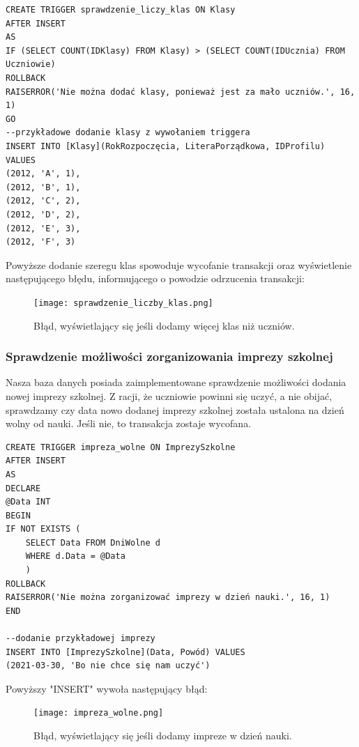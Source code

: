 \documentclass[60pt]{article}
\begin{document}
\begin{verbatim}
CREATE TRIGGER sprawdzenie_liczy_klas ON Klasy
AFTER INSERT
AS
IF (SELECT COUNT(IDKlasy) FROM Klasy) > (SELECT COUNT(IDUcznia) FROM Uczniowie)
ROLLBACK
RAISERROR('Nie można dodać klasy, ponieważ jest za mało uczniów.', 16, 1)
GO
--przykładowe dodanie klasy z wywołaniem triggera
INSERT INTO [Klasy](RokRozpoczęcia, LiteraPorządkowa, IDProfilu) VALUES
(2012, 'A', 1),
(2012, 'B', 1),
(2012, 'C', 2),
(2012, 'D', 2),
(2012, 'E', 3),
(2012, 'F', 3)
\end{verbatim}

Powyższe dodanie szeregu klas spowoduje wycofanie transakcji oraz wyświetlenie następującego błędu, informującego o powodzie odrzucenia transakcji:

\begin{figure}[h]
  \texttt{[image: sprawdzenie\_liczby\_klas.png]}
  \caption{Błąd, wyświetlający się jeśli dodamy więcej klas niż uczniów.}
  \label{Błąd, wyświetlający się jeśli dodamy więcej klas niż uczniów.}
\end{figure}

\subsubsection{Sprawdzenie możliwości zorganizowania imprezy szkolnej}

Nasza baza danych posiada zaimplementowane sprawdzenie możliwości dodania nowej imprezy szkolnej. Z racji, że uczniowie powinni się uczyć, a nie obijać, sprawdzamy czy data nowo dodanej imprezy szkolnej została ustalona na dzień wolny od nauki. Jeśli nie, to transakcja zostaje wycofana.

\begin{verbatim}
CREATE TRIGGER impreza_wolne ON ImprezySzkolne
AFTER INSERT
AS 
DECLARE
@Data INT
BEGIN
IF NOT EXISTS (
    SELECT Data FROM DniWolne d
    WHERE d.Data = @Data
    )
ROLLBACK
RAISERROR('Nie można zorganizować imprezy w dzień nauki.', 16, 1)
END

--dodanie przykładowej imprezy
INSERT INTO [ImprezySzkolne](Data, Powód) VALUES
(2021-03-30, 'Bo nie chce się nam uczyć')
\end{verbatim}

Powyższy "INSERT" wywoła następujący błąd:

\begin{figure}[h]
  \texttt{[image: impreza\_wolne.png]}
  \caption{Błąd, wyświetlający się jeśli dodamy impreze w dzień nauki.}
  \label{Błąd, wyświetlający się jeśli dodamy impreze w dzień nauki.}
\end{figure}
\end{document}
